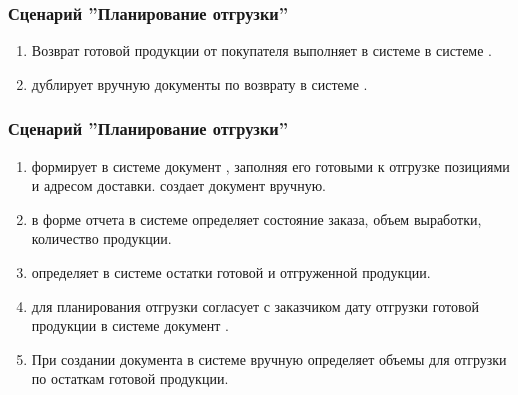 \begin{enumerate}




\end{enumerate}


\subsubsection{Сценарий ''Планирование отгрузки''}
\label{bp:goods_2}

\begin{enumerate}
    \item Возврат готовой продукции от покупателя выполняет в системе \auditor в системе \erp.
    \item \auditor дублирует вручную документы по возврату в системе \buh.
    
\end{enumerate}



\subsubsection{Сценарий ''Планирование отгрузки''}
\label{bp:goods_2}


\begin{enumerate}
    \item \manager формирует в системе \erp документ , заполняя его готовыми к отгрузке позициями и адресом доставки. \manager создает документ вручную.
    \item \manager в форме отчета  в системе \gofro определяет состояние заказа, объем  выработки, количество продукции.
    \item	\manager определяет в системе \erp остатки готовой и отгруженной продукции.
    \item	\manager для планирования отгрузки согласует с заказчиком дату отгрузки готовой продукции в системе \erp документ .
    \item	При создании документа в системе \erp \manager вручную определяет объемы для отгрузки по остаткам готовой продукции.
\end{enumerate}



